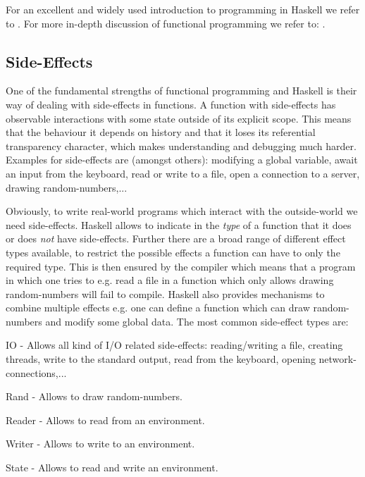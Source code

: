 For an excellent and widely used introduction to programming in Haskell we refer to \citep{hutton_programming_2016}. For more in-depth discussion of functional programming we refer to: \citep{hughes_why_1989, maclennan_functional_1990, hudak_history_2007}.

\subsection{Side-Effects}
One of the fundamental strengths of functional programming and Haskell is their way of dealing with side-effects in functions. A function with side-effects has observable interactions with some state outside of its explicit scope. This means that the behaviour it depends on history and that it loses its referential transparency character, which makes understanding and debugging much harder. Examples for side-effects are (amongst others): modifying a global variable, await an input from the keyboard, read or write to a file, open a connection to a server, drawing random-numbers,...

Obviously, to write real-world programs which interact with the outside-world we need side-effects. Haskell allows to indicate in the \textit{type} of a function that it does or does \textit{not} have side-effects. Further there are a broad range of different effect types available, to restrict the possible effects a function can have to only the required type. This is then ensured by the compiler which means that a program in which one tries to e.g. read a file in a function which only allows drawing random-numbers will fail to compile. Haskell also provides mechanisms to combine multiple effects e.g. one can define a function which can draw random-numbers and modify some global data. The most common side-effect types are:
\begin{itemize*}
	\item IO - Allows all kind of I/O related side-effects: reading/writing a file, creating threads, write to the standard output, read from the keyboard, opening network-connections,... 
	\item Rand - Allows to draw random-numbers.
	\item Reader - Allows to read from an environment.
	\item Writer - Allows to write to an environment.
	\item State - Allows to read and write an environment.
\end{itemize*}

